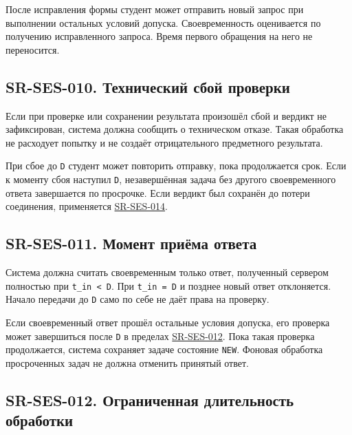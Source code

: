 \documentclass[12pt,a4paper]{article}
\begin{document}
После исправления формы студент может отправить новый запрос при выполнении остальных условий допуска. Своевременность оценивается по получению исправленного запроса. Время первого обращения на него не переносится.

\subsection{SR-SES-010. Технический сбой проверки}\label{sr-ses-010-ux442ux435ux445ux43dux438ux447ux435ux441ux43aux438ux439-ux441ux431ux43eux439-ux43fux440ux43eux432ux435ux440ux43aux438}

\hypertarget{sr-ses-010-технический-сбой-проверки}{}

\hypertarget{sr-ses-010}{}

Если при проверке или сохранении результата произошёл сбой и вердикт не зафиксирован, система должна сообщить о техническом отказе. Такая обработка не расходует попытку и не создаёт отрицательного предметного результата.

При сбое до \texttt{D} студент может повторить отправку, пока продолжается срок. Если к моменту сбоя наступил \texttt{D}, незавершённая задача без другого своевременного ответа завершается по просрочке. Если вердикт был сохранён до потери соединения, применяется {\hyperlink{sr-ses-014}{SR-SES-014}}.

\subsection{SR-SES-011. Момент приёма ответа}\label{sr-ses-011-ux43cux43eux43cux435ux43dux442-ux43fux440ux438ux451ux43cux430-ux43eux442ux432ux435ux442ux430}

\hypertarget{sr-ses-011-момент-приёма-ответа}{}

\hypertarget{sr-ses-011}{}

Система должна считать своевременным только ответ, полученный сервером полностью при \texttt{t\_in\ \textless{}\ D}. При \texttt{t\_in\ =\ D} и позднее новый ответ отклоняется. Начало передачи до \texttt{D} само по себе не даёт права на проверку.

Если своевременный ответ прошёл остальные условия допуска, его проверка может завершиться после \texttt{D} в пределах {\hyperlink{sr-ses-012}{SR-SES-012}}. Пока такая проверка продолжается, система сохраняет задаче состояние \texttt{NEW}. Фоновая обработка просроченных задач не должна отменить принятый ответ.

\subsection{SR-SES-012. Ограниченная длительность обработки}\label{sr-ses-012-ux43eux433ux440ux430ux43dux438ux447ux435ux43dux43dux430ux44f-ux434ux43bux438ux442ux435ux43bux44cux43dux43eux441ux442ux44c-ux43eux431ux440ux430ux431ux43eux442ux43aux438}
\end{document}
